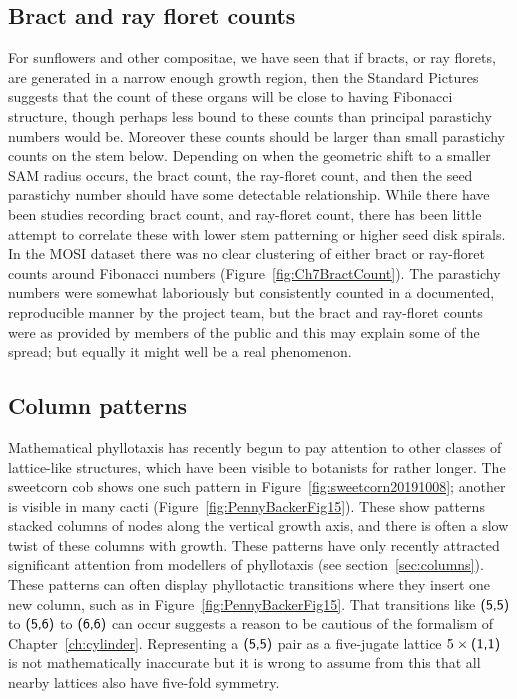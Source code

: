  \subsection{Bract and ray floret counts}
 For sunflowers and other compositae, we have seen that if bracts, or ray florets, are generated in a narrow enough growth region, then the Standard Pictures suggests that the count of these organs will be close to having Fibonacci structure,  though perhaps less bound to these counts than principal parastichy numbers would be. Moreover these counts should be larger than small parastichy counts on the stem below. Depending on when the geometric shift to a smaller SAM radius occurs, the bract count, the ray-floret count, and then the seed parastichy number should have some detectable relationship. While there have been studies recording bract count, and ray-floret count, there has been little attempt to correlate these with lower stem patterning or higher seed disk spirals.
 In the MOSI dataset there was no clear clustering of either bract or ray-floret counts around Fibonacci numbers (Figure~\ref{fig:Ch7BractCount}). The parastichy numbers were somewhat laboriously but consistently counted in a documented, reproducible manner by the project team, but the bract and ray-floret counts were as provided by members of the public and this may explain some of the spread; but equally it might well be a real phenomenon. 
 
 
 
     \subsection{Column patterns}
   
Mathematical phyllotaxis has recently begun to pay attention to other classes of lattice-like structures, which have been visible to botanists for rather longer.
  The  sweetcorn cob  shows one such pattern in Figure~\ref{fig:sweetcorn20191008}; another is visible in many cacti (Figure~\ref{fig:PennyBackerFig15}). These show patterns stacked columns of nodes along the vertical growth axis, and there is often a slow twist of these columns with growth. These patterns have only recently attracted significant attention from
  modellers of phyllotaxis (see section~\ref{sec:columns}). These patterns can often display phyllotactic transitions where they insert one new column, such as in Figure~\ref{fig:PennyBackerFig15}.
  That transitions like  $\textsf{(5,5)}$ to $\textsf{(5,6)}$ to $\textsf{(6,6)}$ can occur suggests a reason to be cautious of  the formalism of Chapter~\ref{ch:cylinder}. Representing a $\textsf{(5,5)}$ pair as a five-jugate lattice $5\times\textsf{(1,1)}$ is not mathematically inaccurate but it is wrong to assume from this that all nearby lattices also have five-fold symmetry. 
  
